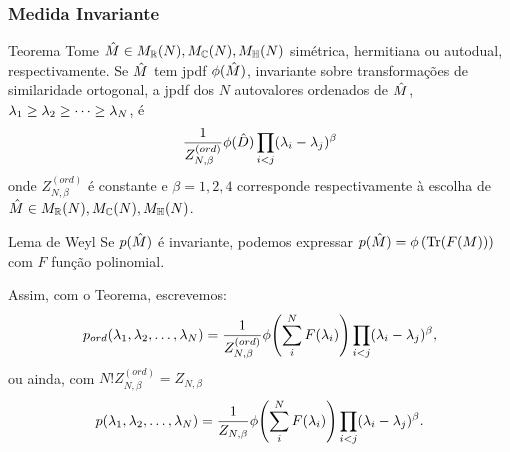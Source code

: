 \begin{frame}
	\frametitle{Medida Invariante}
	\begin{block}{Teorema}
		Tome $\hat M \in M_{\mathbb{R}}(N),  M_{\mathbb{C}}(N),  M_{\mathbb{H}}(N)$ simétrica, hermitiana ou autodual, respectivamente. Se  $\hat M$ tem jpdf $\phi(\hat M)$, invariante sobre transformações de similaridade ortogonal, a jpdf dos $N$ autovalores ordenados de $\hat M$, $\lambda_1 \geq \lambda_2 \geq \dots \geq \lambda_N$, é $$ \frac{1}{Z_{N, \beta}^{(ord)}} \phi(\hat D) \prod_{i < j} (\lambda_i - \lambda_j)^{\beta}$$ onde $Z_{N, \beta}^{(ord)}$ é constante e $\beta = 1, 2, 4$ corresponde respectivamente à escolha de $\hat M \in M_{\mathbb{R}}(N),  M_{\mathbb{C}}(N),  M_{\mathbb{H}}(N)$. 
	\end{block}
\end{frame}
\begin{frame}
	
 	\begin{block}{Lema de Weyl}
 		Se $p(\hat M)$ é invariante, podemos expressar $p(\hat M)= \phi \left(\Tr(F(M)) \right)$ com $F$ função polinomial.
 	\end{block}
	Assim, com o Teorema, escrevemos: 
	\[
		p_{ord}(\lambda_1, \lambda_2, \dots, \lambda_N) = \frac{1}{Z_{N, \beta}^{(ord)}} \phi{\left( \sum_i^N F(\lambda_i) \right)} \prod_{i < j} (\lambda_i - \lambda_j)^{\beta},
	\]
	ou ainda, com $N! Z_{N, \beta}^{(ord)} = Z_{N, \beta}$
	\begin{equation}
		p(\lambda_1, \lambda_2, \dots, \lambda_N) = \frac{1}{Z_{N, \beta}} \phi{\left( \sum_i^N F(\lambda_i) \right)} \prod_{i < j} (\lambda_i - \lambda_j)^{\beta}.
		\label{Equation: p}
	\end{equation}
\end{frame}

